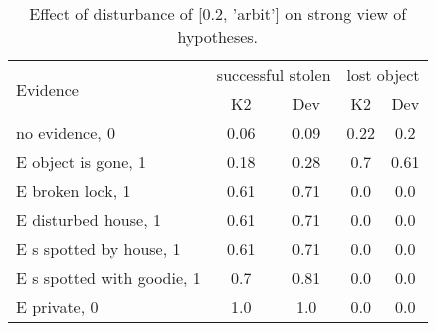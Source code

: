 \begin{table}\begin{tabular}{l|cc|cc}\toprule\multirow{2}{*}{Evidence} & \multicolumn{2}{c}{successful stolen}& \multicolumn{2}{c}{lost object}\\& {K2} & {Dev}& {K2} & {Dev}\\\midrule
no evidence, 0 & 0.06&0.09&0.22&0.2\\E object is gone, 1 & \cellcolor{Bittersweet}0.18&\cellcolor{Bittersweet}0.28&\cellcolor{Bittersweet}0.7&\cellcolor{Bittersweet}0.61\\E broken lock, 1 & \cellcolor{Bittersweet}0.61&\cellcolor{Bittersweet}0.71&0.0&0.0\\E disturbed house, 1 & \cellcolor{Bittersweet}0.61&\cellcolor{Bittersweet}0.71&0.0&0.0\\E s spotted by house, 1 & \cellcolor{Bittersweet}0.61&\cellcolor{Bittersweet}0.71&0.0&0.0\\E s spotted with goodie, 1 & \cellcolor{Bittersweet}0.7&\cellcolor{Bittersweet}0.81&0.0&0.0\\E private, 0 & 1.0&1.0&0.0&0.0\\\bottomrule\end{tabular}\caption{Effect of disturbance of [0.2, 'arbit'] on strong view of hypotheses.}\end{table}